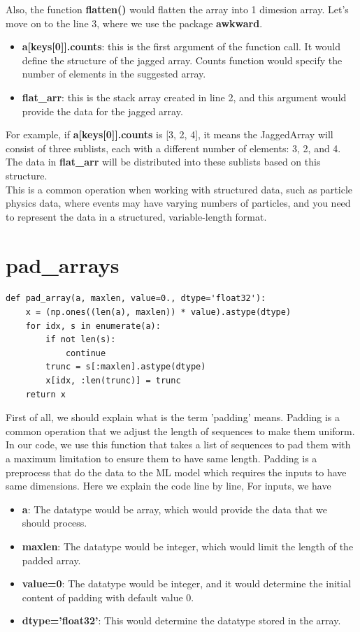 \documentclass[12pt]{report}
\numberwithin{equation}{section}
\begin{document}
Also, the function \textbf{flatten()} would flatten the array into 1 dimesion array.
Let's move on to the line 3, where we use the package \textbf{awkward}.

\begin{itemize}
    \item \textbf{a[keys[0]].counts}: this is the first argument of the function call. It would define the structure of the jagged array. Counts function would specify the number of elements in the suggested array.
    \item \textbf{flat\_arr}: this is the stack array created in line 2, and this argument would provide the data for the jagged array.
\end{itemize}

For example, if \textbf{a[keys[0]].counts} is [3, 2, 4], it means the JaggedArray will consist of three sublists, each with a different number of elements: 3, 2, and 4. 
The data in \textbf{flat\_arr} will be distributed into these sublists based on this structure.
\\
\indent This is a common operation when working with structured data, such as particle physics data, where events may have varying numbers of particles, and you need to represent the data in a structured, variable-length format.

\section{pad\_arrays}

\begin{lstlisting}
def pad_array(a, maxlen, value=0., dtype='float32'):
    x = (np.ones((len(a), maxlen)) * value).astype(dtype)
    for idx, s in enumerate(a):
        if not len(s):
            continue
        trunc = s[:maxlen].astype(dtype)
        x[idx, :len(trunc)] = trunc
    return x
\end{lstlisting}

First of all, we should explain what is the term 'padding' means. 
Padding is a common operation that we adjust the length of sequences to make them uniform. 
In our code, we use this function that takes a list of sequences to pad them with a maximum limitation to ensure them to have same length. 
Padding is a preprocess that do the data to the ML model which requires the inputs to have same dimensions.
Here we explain the code line by line,
For inputs, we have
\begin{itemize}
    \item \textbf{a}: The datatype would be array, which would provide the data that we should process.
    \item \textbf{maxlen}: The datatype would be integer, which would limit the length of the padded array.
    \item \textbf{value=0}: The datatype would be integer, and it would determine the initial content of padding with default value 0.
    \item \textbf{dtype='float32'}: This would determine the datatype stored in the array.
\end{itemize} 
\end{document}

